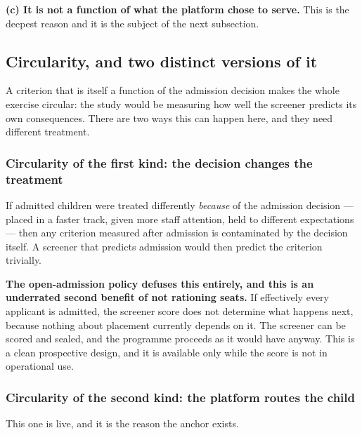 \documentclass[11pt,a4paper]{article}
\begin{document}
\textbf{(c) It is not a function of what the platform chose to serve.} This is
the deepest reason and it is the subject of the next subsection.

\subsection{Circularity, and two distinct versions of it}
\label{sec:contamination}

A criterion that is itself a function of the admission decision makes the whole
exercise circular: the study would be measuring how well the screener predicts
its own consequences. There are two ways this can happen here, and they need
different treatment.

\subsubsection*{Circularity of the first kind: the decision changes the treatment}

If admitted children were treated differently \emph{because} of the admission
decision --- placed in a faster track, given more staff attention, held to
different expectations --- then any criterion measured after admission is
contaminated by the decision itself. A screener that predicts admission would
then predict the criterion trivially.

\textbf{The open-admission policy defuses this entirely, and this is an
underrated second benefit of not rationing seats.} If effectively every
applicant is admitted, the screener score does not determine what happens next,
because nothing about placement currently depends on it. The screener can be
scored and sealed, and the programme proceeds as it would have anyway. This is a
clean prospective design, and it is available only while the score is not in
operational use.


\subsubsection*{Circularity of the second kind: the platform routes the child}

This one is live, and it is the reason the anchor exists.
\end{document}
